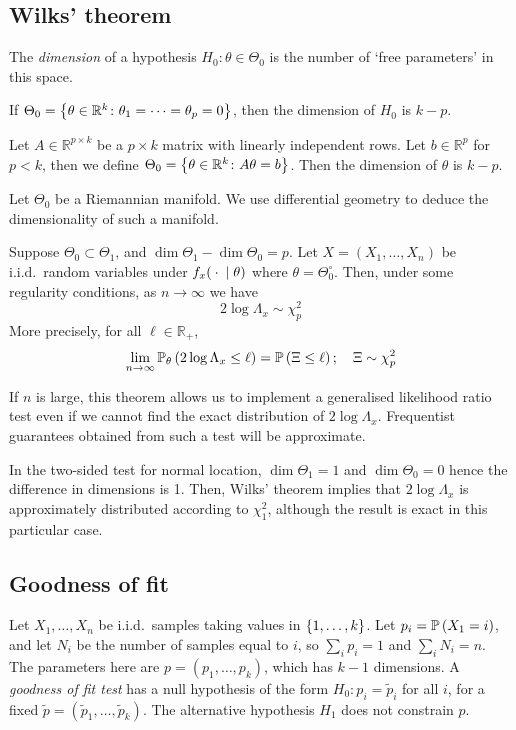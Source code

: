 \subsection{Wilks' theorem}
\begin{definition}
	The \textit{dimension} of a hypothesis \( H_0 \colon \theta \in \Theta_0 \) is the number of `free parameters' in this space.
\end{definition}
\begin{example}
	If \( \Theta_0 = \qty{\theta \in \mathbb R^k \colon \theta_1 = \dots = \theta_p = 0 } \), then the dimension of \( H_0 \) is \( k - p \).

	Let \( A \in \mathbb R^{p \times k} \) be a \( p \times k \) matrix with linearly independent rows.
	Let \( b \in \mathbb R^p \) for \( p < k \), then we define \( \Theta_0 = \qty{\theta \in \mathbb R^k \colon A\theta = b} \).
	Then the dimension of \( \theta \) is \( k - p \).

	Let \( \Theta_0 \) be a Riemannian manifold.
	We use differential geometry to deduce the dimensionality of such a manifold.
\end{example}
\begin{theorem}
	Suppose \( \Theta_0 \subset \Theta_1 \), and \( \dim \Theta_1 - \dim \Theta_0 = p \).
	Let \( X = (X_1, \dots, X_n) \) be i.i.d.\ random variables under \( f_x({}\cdot{}\mid\theta) \) where \( \theta = \Theta_0^\circ \).
	Then, under some regularity conditions, as \( n \to \infty \) we have
	\[ 2\log\Lambda_x \sim \chi_p^2 \]
	More precisely, for all \( \ell \in \mathbb R_+ \),
	\[ \lim_{n \to \infty} \mathbb{P}_{\theta}\left({2\log \Lambda_x \leq \ell}\right) = \mathbb{P}\left({\Xi \leq \ell}\right);\quad \Xi \sim \chi_p^2 \]
\end{theorem}
\begin{remark}
	If \( n \) is large, this theorem allows us to implement a generalised likelihood ratio test even if we cannot find the exact distribution of \( 2 \log \Lambda_x \).
	Frequentist guarantees obtained from such a test will be approximate.
\end{remark}
\begin{example}
	In the two-sided test for normal location, \( \dim \Theta_1 = 1 \) and \( \dim \Theta_0 = 0 \) hence the difference in dimensions is 1.
	Then, Wilks' theorem implies that \( 2 \log \Lambda_x \) is approximately distributed according to \( \chi_1^2 \), although the result is exact in this particular case.
\end{example}

\subsection{Goodness of fit}
Let \( X_1, \dots, X_n \) be i.i.d.\ samples taking values in \( \qty{1, \dots, k} \).
Let \( p_i = \mathbb{P}\left({X_1 = i}\right) \), and let \( N_i \) be the number of samples equal to \( i \), so \( \sum_i p_i = 1\) and \( \sum_i N_i = n \).
The parameters here are \( p = (p_1, \dots, p_k) \), which has \( k - 1 \) dimensions.
A \textit{goodness of fit test} has a null hypothesis of the form \( H_0 \colon p_i = \widetilde p_i \) for all \( i \), for a fixed \( \widetilde p = (\widetilde p_1, \dots, \widetilde p_k) \).
The alternative hypothesis \( H_1 \) does not constrain \( p \).

